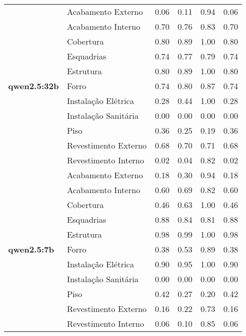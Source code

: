 \begin{table}[htbp]
\begin{tabular}{llcccc}
    \midrule
    \multirow{11}{*}{\textbf{qwen2.5:32b}} & \multirow{1}{*}{Acabamento Externo} & 0.06 & 0.11 & 0.94 & 0.06 \\
     & \multirow{1}{*}{Acabamento Interno} & 0.70 & 0.76 & 0.83 & 0.70 \\
     & \multirow{1}{*}{Cobertura} & 0.80 & 0.89 & 1.00 & 0.80 \\
     & \multirow{1}{*}{Esquadrias} & 0.74 & 0.77 & 0.79 & 0.74 \\
     & \multirow{1}{*}{Estrutura} & 0.80 & 0.89 & 1.00 & 0.80 \\
     & \multirow{1}{*}{Forro} & 0.74 & 0.80 & 0.87 & 0.74 \\
     & \multirow{1}{*}{Instalação Elétrica} & 0.28 & 0.44 & 1.00 & 0.28 \\
     & \multirow{1}{*}{Instalação Sanitária} & 0.00 & 0.00 & 0.00 & 0.00 \\
     & \multirow{1}{*}{Piso} & 0.36 & 0.25 & 0.19 & 0.36 \\
     & \multirow{1}{*}{Revestimento Externo} & 0.68 & 0.70 & 0.71 & 0.68 \\
     & \multirow{1}{*}{Revestimento Interno} & 0.02 & 0.04 & 0.82 & 0.02 \\
    \midrule
    \multirow{11}{*}{\textbf{qwen2.5:7b}} & \multirow{1}{*}{Acabamento Externo} & 0.18 & 0.30 & 0.94 & 0.18 \\
     & \multirow{1}{*}{Acabamento Interno} & 0.60 & 0.69 & 0.82 & 0.60 \\
     & \multirow{1}{*}{Cobertura} & 0.46 & 0.63 & 1.00 & 0.46 \\
     & \multirow{1}{*}{Esquadrias} & 0.88 & 0.84 & 0.81 & 0.88 \\
     & \multirow{1}{*}{Estrutura} & 0.98 & 0.99 & 1.00 & 0.98 \\
     & \multirow{1}{*}{Forro} & 0.38 & 0.53 & 0.89 & 0.38 \\
     & \multirow{1}{*}{Instalação Elétrica} & 0.90 & 0.95 & 1.00 & 0.90 \\
     & \multirow{1}{*}{Instalação Sanitária} & 0.00 & 0.00 & 0.00 & 0.00 \\
     & \multirow{1}{*}{Piso} & 0.42 & 0.27 & 0.20 & 0.42 \\
     & \multirow{1}{*}{Revestimento Externo} & 0.16 & 0.22 & 0.73 & 0.16 \\
     & \multirow{1}{*}{Revestimento Interno} & 0.06 & 0.10 & 0.85 & 0.06 \\
    \bottomrule
  \end{tabular}
\end{table}